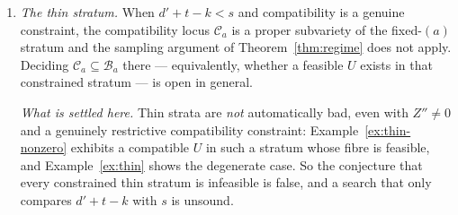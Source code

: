 \documentclass[journal]{IEEEtran}
\theoremstyle{plainn}
\theoremstyle{remark}
\begin{document}
\begin{enumerate}[label=(\Alph*),leftmargin=2.2em,itemsep=2pt]
\item \emph{The thin stratum.} When $d'+t-k<s$ and compatibility is a genuine constraint, the
compatibility locus $\mathcal C_a$ is a proper subvariety of the fixed-$(a)$ stratum and the sampling
argument of Theorem~\ref{thm:regime} does not apply. Deciding $\mathcal C_a\subseteq\mathcal B_a$
there --- equivalently, whether a feasible $U$ exists in that constrained stratum --- is open in
general.

\emph{What is settled here.} Thin strata are \emph{not} automatically bad, even with $Z''\ne0$ and a
genuinely restrictive compatibility constraint: Example~\ref{ex:thin-nonzero} exhibits a compatible $U$
in such a stratum whose fibre is feasible, and Example~\ref{ex:thin} shows the degenerate case. So the
conjecture that every constrained thin stratum is infeasible is false, and a search that only compares
$d'+t-k$ with $s$ is unsound.


\end{enumerate}
\end{document}
